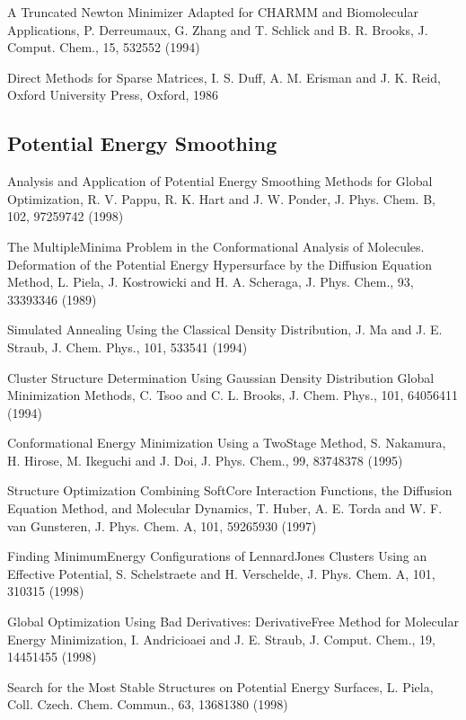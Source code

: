 \documentclass[letterpaper,11pt,english]{sphinxmanual}
\begin{document}
A Truncated Newton Minimizer Adapted for CHARMM and Biomolecular Applications, P. Derreumaux, G. Zhang and T. Schlick and B. R. Brooks, J. Comput. Chem., 15, 532\sphinxhyphen{}552 (1994)

Direct Methods for Sparse Matrices, I. S. Duff, A. M. Erisman and J. K. Reid, Oxford University Press, Oxford, 1986


\subsection{Potential Energy Smoothing}
\label{\detokenize{text/references:potential-energy-smoothing}}
Analysis and Application of Potential Energy Smoothing Methods for Global Optimization, R. V. Pappu, R. K. Hart and J. W. Ponder, J. Phys. Chem. B, 102, 9725\sphinxhyphen{}9742 (1998)

The Multiple\sphinxhyphen{}Minima Problem in the Conformational Analysis of Molecules. Deformation of the Potential Energy Hypersurface by the Diffusion Equation Method, L. Piela, J. Kostrowicki and H. A. Scheraga, J. Phys. Chem., 93, 3339\sphinxhyphen{}3346 (1989)

Simulated Annealing Using the Classical Density Distribution, J. Ma and J. E. Straub, J. Chem. Phys., 101, 533\sphinxhyphen{}541 (1994)

Cluster Structure Determination Using Gaussian Density Distribution Global Minimization Methods, C. Tsoo and C. L. Brooks, J. Chem. Phys., 101, 6405\sphinxhyphen{}6411 (1994)

Conformational Energy Minimization Using a Two\sphinxhyphen{}Stage Method, S. Nakamura, H. Hirose, M. Ikeguchi and J. Doi, J. Phys. Chem., 99, 8374\sphinxhyphen{}8378 (1995)

Structure Optimization Combining Soft\sphinxhyphen{}Core Interaction Functions, the Diffusion Equation Method, and Molecular Dynamics, T. Huber, A. E. Torda and W. F. van Gunsteren, J. Phys. Chem. A, 101, 5926\sphinxhyphen{}5930 (1997)

Finding Minimum\sphinxhyphen{}Energy Configurations of Lennard\sphinxhyphen{}Jones Clusters Using an Effective Potential, S. Schelstraete and H. Verschelde, J. Phys. Chem. A, 101, 310\sphinxhyphen{}315 (1998)

Global Optimization Using Bad Derivatives: Derivative\sphinxhyphen{}Free Method for Molecular Energy Minimization, I. Andricioaei and J. E. Straub, J. Comput. Chem., 19, 1445\sphinxhyphen{}1455 (1998)

Search for the Most Stable Structures on Potential Energy Surfaces, L. Piela, Coll. Czech. Chem. Commun., 63, 1368\sphinxhyphen{}1380 (1998)
\end{document}
